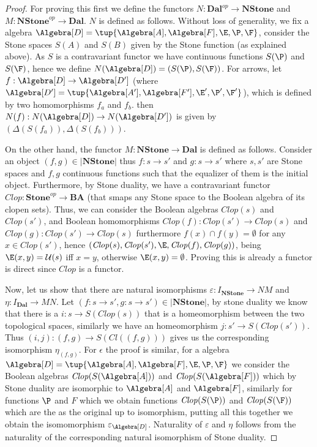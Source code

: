 \begin{proof}
For proving this first we define the functors $N: \mathbf{Dal}^{op} \rightarrow \mathbf{NStone}$ and $M: \mathbf{NStone}^{op} \rightarrow \mathbf{Dal}$.  $N$ is defined as follows.
Without loss of generality,   we fix a \DAL algebra  $\Algebra[D] = \tup{\Algebra[A], \Algebra[F], \E, \P, \F}$,  consider the Stone spaces $S(A)$ and $S(B)$ given by the Stone function (as explained above).  As $S$ is a 
contravariant functor we have continuous functions $S(\P)$ and $S(\F)$, hence we define $N(\Algebra[D]) = (S(\P),  S(\F))$.  For arrows, let
$f : \Algebra[D] \rightarrow \Algebra[D']$ (where $\Algebra[D'] = \tup{\Algebra[A'], \Algebra[F'], \E', \P', \F'}$),  which is defined by two homomorphisms $f_a$ and $f_b$. 
then $N(f) : N(\Algebra[D]) \rightarrow N(\Algebra[D'])$ is given by $(\Delta(S(f_a)), \Delta(S(f_b)))$.  

On the other hand,  the functor $M : \mathbf{NStone} \rightarrow \mathbf{Dal}$ is defined as follows.   Consider an object $(f,g) \in |\mathbf{NStone}|$ thus $f: s \rightarrow s'$ and $g:s \rightarrow s'$
where $s,s'$ are Stone spaces and $f,g$ continuous functions such that the equalizer of them is the initial object.  Furthermore, by Stone duality,  we have a contravariant functor $\mathit{Clop}: \mathbf{Stone}^{op} \rightarrow \mathbf{BA}$ (that smaps any Stone space to the Boolean algebra of its clopen sets).  Thus,   we can consider the Boolean  algebras $\mathit{Clop}(s)$ and $\mathit{Clop}(s')$, and Boolean homomorphisms $\mathit{Clop}(f): \mathit{Clop}(s') \rightarrow \mathit{Clop}(s)$
and $\mathit{Clop}(g): \mathit{Clop}(s') \rightarrow \mathit{Clop}(s)$ furthermore $f(x) \cap f(y) = \emptyset$ for any $x \in \mathit{Clop}(s')$, hence $(\mathit{Clop}(s), \mathit{Clop}(s'), \E,  \mathit{Clop}(f), \mathit{Clop}(g))$, being $\E(x,y) = \mathcal{U}(s)$ iff $x=y$, otherwise $\E(x,y) = \emptyset$.  Proving this is already a functor is direct since $\mathit{Clop}$ is a functor.

Now,  let us show that there are natural isomorphisms $\varepsilon: I_{\mathbf{NStone}} \rightarrow NM$ and $\eta : I_{\mathbf{Dal}} \rightarrow MN$.   Let $(f:s \rightarrow s',g:s \rightarrow s') \in |\mathbf{NStone}|$,
by stone duality we know that there is a $i :s \rightarrow S(\mathit{Clop}(s))$ that is a homeomorphism between the two topological spaces,  similarly we have an homeomorphism $j: s' \rightarrow S(\mathit{Clop}(s'))$. Thus $(i,j) : (f,g) \rightarrow S(Cl((f,g)))$ gives us the corresponding isomorphism $\eta_{(f,g)}$.  For $\epsilon$ the proof is similar, for a  \DAL algebra  $\Algebra[D] = \tup{\Algebra[A], \Algebra[F], \E, \P, \F}$ we consider the Boolean algebras $\mathit{Clop}(S(\Algebra[A]))$ and $\mathit{Clop}(S(\Algebra[F]))$ which by Stone duality are isomorphic to $\Algebra[A]$ and $\Algebra[F]$, similarly for functions 
$\P$ and $F$ which we obtain functions $\mathit{Clop}(S(\P))$ and  $\mathit{Clop}(S(\F))$ which are the as the original up to isomorphism, putting all this together we obtain the isomomorphism $\varepsilon_{\Algebra[D]}$. Naturality of $\varepsilon$ and $\eta$ follows from the naturality of the corresponding natural isomorphism of Stone duality.
\end{proof}

